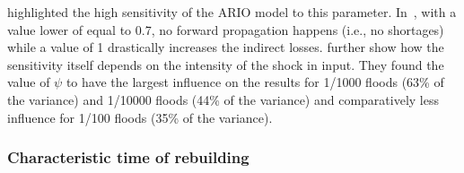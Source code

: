 
\Textcite{koks-2014-integ-direc, hallegatte-2013-model-role} highlighted the high sensitivity of the ARIO model to this
parameter. In~\textcite{hallegatte-2013-model-role}, with a value
lower of equal to 0.7, no forward propagation happens (i.e., no shortages) while
a value of 1 drastically increases the indirect losses.
\Textcite{koks-2014-integ-direc} further show how the
sensitivity itself depends on the intensity of the shock in input. They found
the value of $\psi$ to have the largest influence on the results
for 1/1000 floods (63\% of the variance) and 1/10000 floods (44\% of the
variance) and comparatively less influence for 1/100 floods (35\% of the
variance).

\subsubsection{Characteristic time of rebuilding}
\label{sec:recovery-param}

